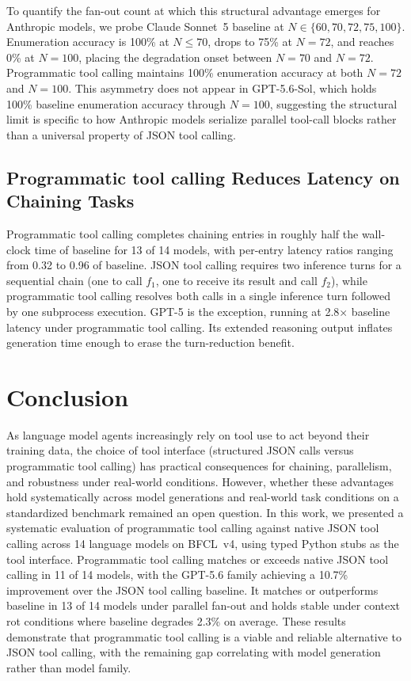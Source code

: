 \documentclass[11pt]{article}
\newcommand{\bfcl}{BFCL~v4}
\newcommand{\codemode}{programmatic tool calling}
\newcommand{\Codemode}{Programmatic tool calling}
\newcommand{\jsonmode}{JSON tool calling}
\newcommand{\nmodels}{14}
\begin{document}
To quantify the fan-out count at which this structural advantage emerges for Anthropic models,
we probe Claude Sonnet~5 baseline at $N \in \{60, 70, 72, 75, 100\}$.
Enumeration accuracy is 100\% at $N \leq 70$, drops to 75\% at $N = 72$, and reaches 0\% at
$N = 100$, placing the degradation onset between $N = 70$ and $N = 72$.
\Codemode{} maintains 100\% enumeration accuracy at both $N = 72$ and $N = 100$.
This asymmetry does not appear in GPT-5.6-Sol, which holds 100\% baseline enumeration accuracy
through $N = 100$, suggesting the structural limit is specific to how Anthropic models
serialize parallel tool-call blocks rather than a universal property of JSON tool calling.

\subsection{\Codemode{} Reduces Latency on Chaining Tasks}

\Codemode{} completes chaining entries in roughly half the wall-clock time
of baseline for 13 of \nmodels{} models, with per-entry latency ratios ranging
from 0.32 to 0.96 of baseline.
JSON tool calling requires two inference turns for a sequential chain (one to call
$f_1$, one to receive its result and call $f_2$), while \codemode{} resolves both
calls in a single inference turn followed by one subprocess execution.
GPT-5 is the exception, running at 2.8$\times$ baseline latency under
\codemode{}. Its extended reasoning output inflates generation time enough
to erase the turn-reduction benefit.

\section{Conclusion}

As language model agents increasingly rely on tool use to act beyond their training data,
the choice of tool interface (structured JSON calls versus programmatic tool calling)
has practical consequences for chaining, parallelism, and robustness under real-world conditions.
However, whether these advantages hold systematically across model generations and
real-world task conditions on a standardized benchmark remained an open question.
In this work, we presented a systematic evaluation of programmatic tool calling against
native \jsonmode{} across \nmodels{} language models on \bfcl{},
using typed Python stubs as the tool interface.
Programmatic tool calling matches or exceeds native \jsonmode{} in 11 of 14 models,
with the GPT-5.6 family achieving a 10.7\% improvement over the \jsonmode{} baseline.
It matches or outperforms baseline in 13 of 14 models under parallel fan-out and
holds stable under context rot conditions where baseline degrades 2.3\% on average.
These results demonstrate that programmatic tool calling is a viable and reliable
alternative to \jsonmode{}, with the remaining gap correlating with model generation
rather than model family.
\end{document}
